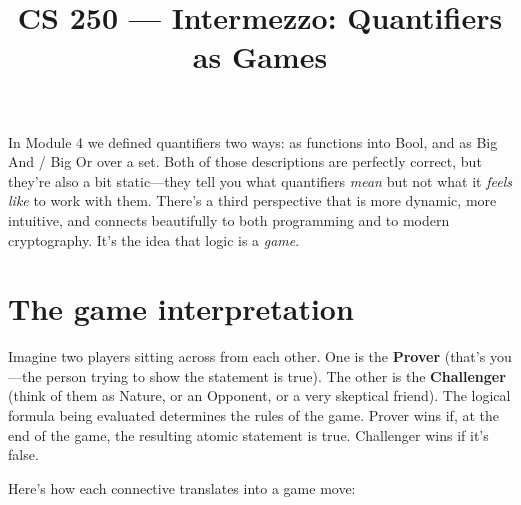 \documentclass[11pt]{article}
\title{CS 250 --- Intermezzo: Quantifiers as Games}
\author{}
\date{}
\begin{document}
\maketitle

In Module 4 we defined quantifiers two ways: as functions into Bool, and as Big And / Big Or over a set. Both of those descriptions are perfectly correct, but they're also a bit static---they tell you what quantifiers \emph{mean} but not what it \emph{feels like} to work with them. There's a third perspective that is more dynamic, more intuitive, and connects beautifully to both programming and to modern cryptography. It's the idea that logic is a \emph{game}.

\section{The game interpretation}

Imagine two players sitting across from each other. One is the \textbf{Prover} (that's you---the person trying to show the statement is true). The other is the \textbf{Challenger} (think of them as Nature, or an Opponent, or a very skeptical friend). The logical formula being evaluated determines the rules of the game. Prover wins if, at the end of the game, the resulting atomic statement is true. Challenger wins if it's false.

Here's how each connective translates into a game move:
\end{document}
